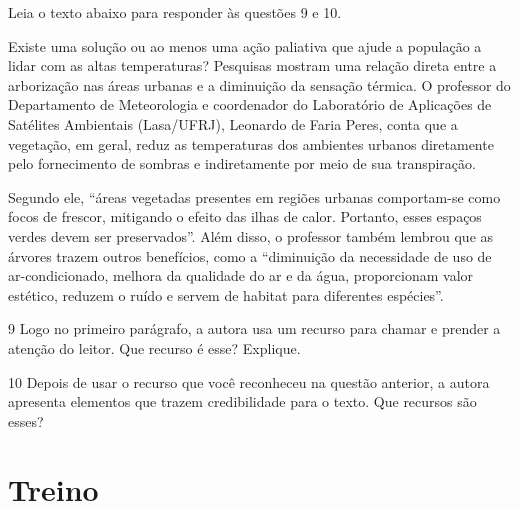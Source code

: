 Leia o texto abaixo para responder às questões 9 e 10. 

\begin{myquote}

Existe uma solução ou ao menos uma ação paliativa que ajude a população a
lidar com as altas temperaturas? Pesquisas mostram uma relação direta entre a
arborização nas áreas urbanas e a diminuição da sensação térmica. O professor
do Departamento de Meteorologia e coordenador do Laboratório de Aplicações de
Satélites Ambientais (Lasa/UFRJ), Leonardo de Faria Peres, conta que a
vegetação, em geral, reduz as temperaturas dos ambientes urbanos diretamente
pelo fornecimento de sombras e indiretamente por meio de sua transpiração.

Segundo ele, ``áreas vegetadas presentes em regiões urbanas comportam-se como
focos de frescor, mitigando o efeito das ilhas de calor. Portanto, esses
espaços verdes devem ser preservados''. Além disso, o professor também lembrou
que as árvores trazem outros benefícios, como a ``diminuição da necessidade de
uso de ar-condicionado, melhora da qualidade do ar e da água, proporcionam
valor estético, reduzem o ruído e servem de habitat para diferentes espécies''.


\end{myquote}

\num{9} Logo no primeiro parágrafo, a autora usa um recurso para chamar e prender
a atenção do leitor. Que recurso é esse? Explique. 


\num{10} Depois de usar o recurso que você reconheceu na questão anterior, a 
autora apresenta elementos que trazem credibilidade para o texto. Que recursos
são esses? 


\section*{Treino}

